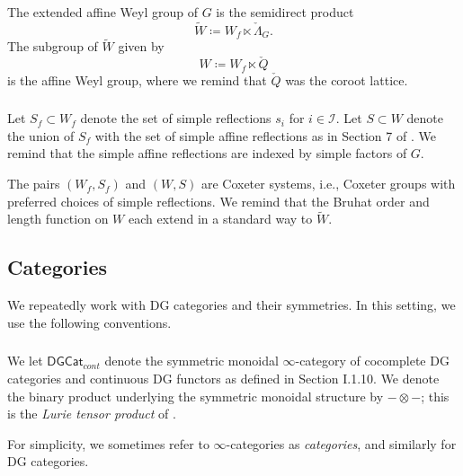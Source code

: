 \documentclass[11pt,reqno]{amsart}
\theoremstyle{remark}
\numberwithin{equation}{section}
\newcommand{\DGCat}{\mathsf{DGCat}}
\begin{document}
The extended affine Weyl group of 
$G$ is the semidirect product 
%
\[ \widetilde{W} \coloneqq W_f \ltimes \check{\Lambda}_G.\]
%
The subgroup of $\widetilde{W}$ given by 
%
\[
W \coloneqq W_f \ltimes \check{Q} 
\] 
%
\noindent is the affine Weyl group, where we remind
that $\check{Q}$ was the coroot lattice.

\subsubsection{}

Let $S_f \subset W_f$ denote the set of simple reflections
$s_i$ for $i \in \mathscr{I}$. 
Let $S \subset W$ denote the union of $S_f$ with 
the set of simple affine reflections as in 
Section 7 of \cite{kitty}. We remind that the
simple affine reflections are indexed by simple
factors of $G$.

The pairs $(W_f,S_f)$ and $(W,S)$ are {Coxeter systems},
i.e., Coxeter groups with preferred choices of simple
reflections.
We remind that the Bruhat order and length function on $W$ 
each extend in a standard way to $\widetilde{W}$. 

%

\subsection{Categories} 

We repeatedly work with DG categories and their 
symmetries. In this setting, we use the following conventions.

\subsubsection{}

We let $\DGCat_{cont}$ denote the symmetric monoidal
$\infty$-category of cocomplete DG categories and
continuous DG functors as 
defined in \cite{grbook} Section I.1.10.
We denote the binary product underlying the symmetric
monoidal structure by $-\otimes -$; this is the
\emph{Lurie tensor product} of \cite{higheralgebra}.

For simplicity, we sometimes refer to $\infty$-categories
as \emph{categories}, and similarly for DG categories.

\subsubsection{}
\end{document}
